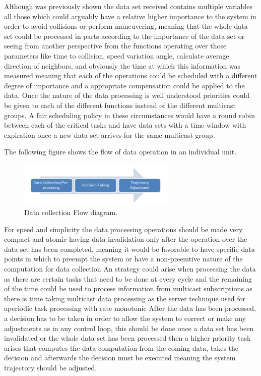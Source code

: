 \documentclass[journal]{IEEEtran}
\begin{document}
Although was previously shown the data set received contains multiple variables all those which could arguably have a relative higher importance to the system in order to avoid collisions or perform maneuvering, meaning that the whole data set could be processed in parts according to the importance of the data set or seeing from another perspective from the functions operating over those parameters like time to collision, speed variation angle, calculate average direction of neighbors, and obviously the time at which this information was measured meaning that each of the operations could be scheduled with a different degree of importance and a appropriate compensation could be applied to the data.
Once the nature of the data processing is well understood priorities could be given to each of the different functions instead of the different multicast groups.
A fair scheduling policy in these circumstances would have a round robin between each of the critical tasks and have data sets with a time window with expiration once a new data set arrives for the same multicast group.

The following figure shows the flow of data operation in an individual unit.

\begin{figure}[h!]
        \begin{center}
        \includegraphics[width=3in]{capture.png}
        \caption{Data collection Flow diagram.}
        \end{center}
\end{figure}

For speed and simplicity the data processing operations should be made very compact and atomic having data invalidation only after the operation over the data set  has been completed, meaning it would be favorable to have specific data points in which to preempt the system or have a non-preemtive nature of the computation for data collection
An strategy could arise when processing the data as there are certain tasks that need to be done at every cycle and the remaining of the time could be used to process information from multicast subscriptions as there is time taking multicast data processing as the server technique used for aperiodic task processing with rate monotonic
After the data has been processed, a decision has to be taken in order to allow the system to correct or make any adjustments as in any control loop, this should be done once a data set has been invalidated or the whole data set has been processed then a higher priority task arises that computes the data computation from the coming data, takes the decision and afterwards the decision must be executed meaning the system trajectory should be adjusted.
\end{document}
